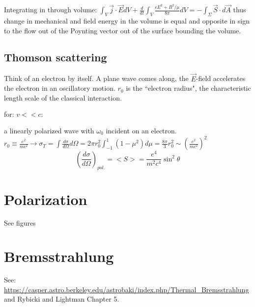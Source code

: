 \documentclass[12pt]{report}
\begin{document}
 Integrating in through volume: 
 $ \int_V \vec{j}\cdot\vec{E} dV +\frac{d}{dt}\int_V\frac{\epsilon E^2 +B^2/\mu}{8\pi}dV=-\int_\Sigma \vec{S}\cdot d\vec{A} $ 
 thus change in mechanical and field energy in the volume is equal and opposite in sign to the flow out of the Poynting vector out of the surface bounding the volume. \\
 
 \subsection{Thomson scattering}
  Think of an electron by itself. A plane wave comes along, the $\vec{E}$-field accelerates the electron in an oscillatory motion.  $r_0$ is the ``electron radius",  the characteristic length scale of the classical interaction.
  
 for: \( v<<c\):
 
 a linearly polarized wave with $\omega_0$ incident on an electron.\\
 \(r_0\equiv \frac{e^2}{mc^2}\rightarrow \sigma_T=\int\frac{d\sigma}{d\Omega}d\Omega= 2\pi r_0^2 \int_{-1}^1(1-\mu^2)d\mu=\frac{8\pi}{3}r_0^2 \sim (\frac{e^2}{mc^2})^2\)\\
 
 \[(\frac{d\sigma}{d\Omega})_{pol.}=<S>=\frac{e^4}{m^2c^4}\sin^2\theta\]
 
 \newpage
\section{Polarization}
See figures


\section{Bremsstrahlung}

See: \url{https://casper.astro.berkeley.edu/astrobaki/index.php/Thermal_Bremsstrahlung} and Rybicki and Lightman Chapter 5. 
\end{document}

